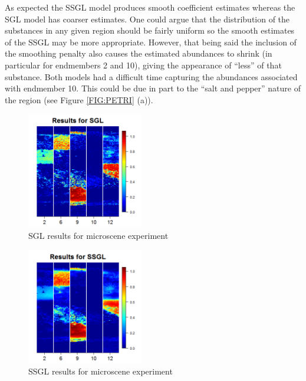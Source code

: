 \documentclass{article}
\numberwithin{equation}{section}
\theoremstyle{plain}
\begin{document}
As expected the SSGL model produces smooth coefficient estimates whereas the SGL
model has coarser estimates. One could argue that the distribution of the
substances in any given region should be fairly uniform so the smooth estimates
of the SSGL may be more appropriate. However, that being said the
inclusion of the smoothing penalty also causes the estimated abundances to
shrink (in particular for endmembers 2 and 10), giving the appearance of
``less'' of that substance.
Both models had a difficult time capturing the abundances associated with
endmember 10. This could be due in
part to the ``salt and pepper'' nature of the region (see Figure \ref{FIG:PETRI}
(a)).

\begin{figure}[h!]
\begin{center}
\includegraphics[width = 2.0in]{sgl_res_roi.png}
\caption{SGL results for microscene experiment}
\label{FIG:MSGL}
\end{center}
\end{figure}

\begin{figure}[h!]
\begin{center}
\includegraphics[width = 2.0in]{ssgl_res_roi.png}
\caption{SSGL results for microscene experiment}
\label{FIG:MSSGL}
\end{center}
\end{figure}
 
 
 
\end{document}
